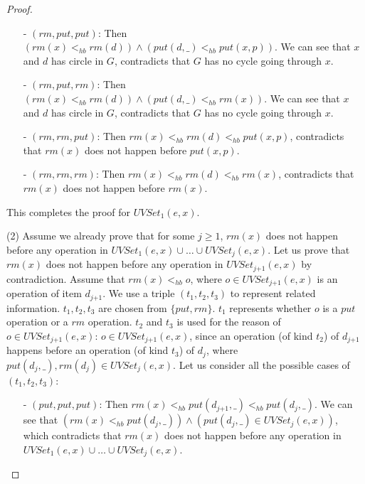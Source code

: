 \begin {proof}
\begin{itemize}
\item[-] $(\textit{rm},\textit{put},\textit{put})$: Then $( \textit{rm}(x) <_{hb} \textit{rm}(d) ) \wedge ( \textit{put}(d,\_) <_{hb} \textit{put}(x,p) )$. We can see that $x$ and $d$ has circle in $G$, contradicts that $G$ has no cycle going through $x$.

\item[-] $(\textit{rm},\textit{put},\textit{rm})$: Then $( \textit{rm}(x) <_{hb} \textit{rm}(d) ) \wedge ( \textit{put}(d,\_) <_{hb} \textit{rm}(x) )$. We can see that $x$ and $d$ has circle in $G$, contradicts that $G$ has no cycle going through $x$.

\item[-] $(\textit{rm},\textit{rm},\textit{put})$: Then $\textit{rm}(x) <_{hb} \textit{rm}(d) <_{hb} \textit{put}(x,p)$, contradicts that $\textit{rm}(x)$ does not happen before $\textit{put}(x,p)$.

\item[-] $(\textit{rm},\textit{rm},\textit{rm})$: Then $\textit{rm}(x) <_{hb} \textit{rm}(d) <_{hb} \textit{rm}(x)$, contradicts that $\textit{rm}(x)$ does not happen before $\textit{rm}(x)$.
\end{itemize}

This completes the proof for $\textit{UVSet}_1(e,x)$.

\noindent (2) Assume we already prove that for some $j \geq 1$, $\textit{rm}(x)$ does not happen before any operation in $\textit{UVSet}_1(e,x) \cup \ldots \cup \textit{UVSet}_j(e,x)$. Let us prove that $\textit{rm}(x)$ does not happen before any operation in $\textit{UVSet}_{\textit{j+1}}(e,x)$ by contradiction. Assume that $\textit{rm}(x) <_{hb} o$, where $o \in \textit{UVSet}_{\textit{j+1}}(e,x)$ is an operation of item $d_{\textit{j+1}}$. We use a triple $(t_1,t_2,t_3)$ to represent related information. $t_1,t_2,t_3$ are chosen from $\{ \textit{put},\textit{rm} \}$. $t_1$ represents whether $o$ is a $\textit{put}$ operation or a $\textit{rm}$ operation. $t_2$ and $t_3$ is used for the reason of $o \in \textit{UVSet}_{\textit{j+1}}(e,x)$: $o \in \textit{UVSet}_{\textit{j+1}}(e,x)$, since an operation (of kind $t_2$) of $d_{\textit{j+1}}$ happens before an operation (of kind $t_3$) of $d_j$, where $\textit{put}(d_j,\_), \textit{rm}(d_j) \in \textit{UVSet}_j(e,x)$. Let us consider all the possible cases of $(t_1,t_2,t_3)$:

\begin{itemize}
\setlength{\itemsep}{0.5pt}
\item[-] $(\textit{put},\textit{put},\textit{put})$: Then $\textit{rm}(x) <_{hb} \textit{put}(d_{\textit{j+1}},\_) <_{hb} \textit{put}(d_j,\_)$. We can see that $( \textit{rm}(x) <_{hb} \textit{put}(d_j,\_) ) \wedge ( \textit{put}(d_j,\_) \in \textit{UVSet}_j(e,x) )$, which contradicts that $\textit{rm}(x)$ does not happen before any operation in $\textit{UVSet}_1(e,x) \cup \ldots \cup \textit{UVSet}_j(e,x)$.


\end{itemize}
\end{proof}
